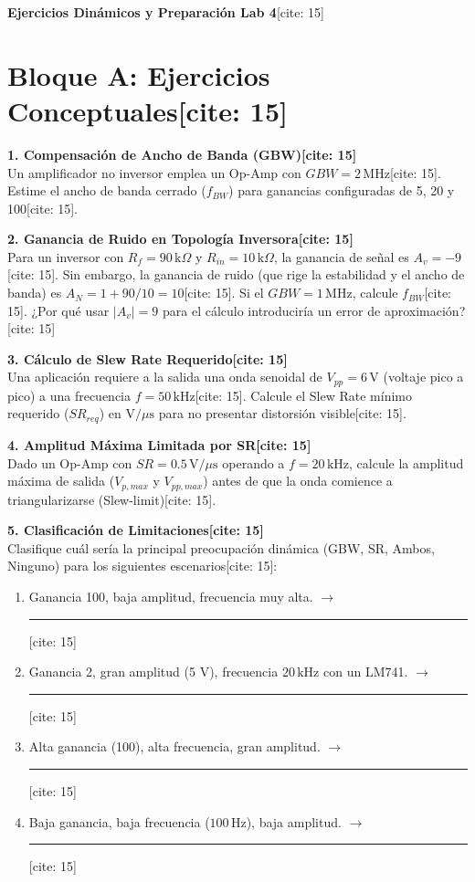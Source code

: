 \documentclass[11pt, a4paper]{article}
\begin{document}
\begin{center}
    \Large\textbf{\textcolor{ucbblue}{Ejercicios Dinámicos y Preparación Lab 4}}[cite: 15]
\end{center}

\section*{Bloque A: Ejercicios Conceptuales[cite: 15]}

\textbf{1. Compensación de Ancho de Banda (GBW)[cite: 15]} \\
Un amplificador no inversor emplea un Op-Amp con $GBW = 2\,\text{MHz}$[cite: 15]. Estime el ancho de banda cerrado ($f_{BW}$) para ganancias configuradas de 5, 20 y 100[cite: 15].

\vspace{1cm}
\textbf{2. Ganancia de Ruido en Topología Inversora[cite: 15]} \\
Para un inversor con $R_f = 90\,\text{k}\Omega$ y $R_{in} = 10\,\text{k}\Omega$, la ganancia de señal es $A_v = -9$[cite: 15]. Sin embargo, la ganancia de ruido (que rige la estabilidad y el ancho de banda) es $A_N = 1 + 90/10 = 10$[cite: 15]. Si el $GBW = 1\,\text{MHz}$, calcule $f_{BW}$[cite: 15]. ¿Por qué usar $|A_v|=9$ para el cálculo introduciría un error de aproximación?[cite: 15]

\vspace{1cm}
\textbf{3. Cálculo de Slew Rate Requerido[cite: 15]} \\
Una aplicación requiere a la salida una onda senoidal de $V_{pp} = 6\,\text{V}$ (voltaje pico a pico) a una frecuencia $f = 50\,\text{kHz}$[cite: 15]. Calcule el Slew Rate mínimo requerido ($SR_{req}$) en $\text{V}/\mu\text{s}$ para no presentar distorsión visible[cite: 15].

\vspace{1.5cm}
\textbf{4. Amplitud Máxima Limitada por SR[cite: 15]} \\
Dado un Op-Amp con $SR = 0.5\,\text{V}/\mu\text{s}$ operando a $f = 20\,\text{kHz}$, calcule la amplitud máxima de salida ($V_{p,max}$ y $V_{pp,max}$) antes de que la onda comience a triangularizarse (Slew-limit)[cite: 15].

\vspace{1.5cm}
\textbf{5. Clasificación de Limitaciones[cite: 15]} \\
Clasifique cuál sería la principal preocupación dinámica (GBW, SR, Ambos, Ninguno) para los siguientes escenarios[cite: 15]:
\begin{enumerate}
    \item Ganancia 100, baja amplitud, frecuencia muy alta. $\rightarrow$ \rule{3cm}{0.4pt}[cite: 15]
    \item Ganancia 2, gran amplitud (5 V), frecuencia $20\,\text{kHz}$ con un LM741. $\rightarrow$ \rule{3cm}{0.4pt}[cite: 15]
    \item Alta ganancia (100), alta frecuencia, gran amplitud. $\rightarrow$ \rule{3cm}{0.4pt}[cite: 15]
    \item Baja ganancia, baja frecuencia ($100\,\text{Hz}$), baja amplitud. $\rightarrow$ \rule{3cm}{0.4pt}[cite: 15]
\end{enumerate}
\end{document}
